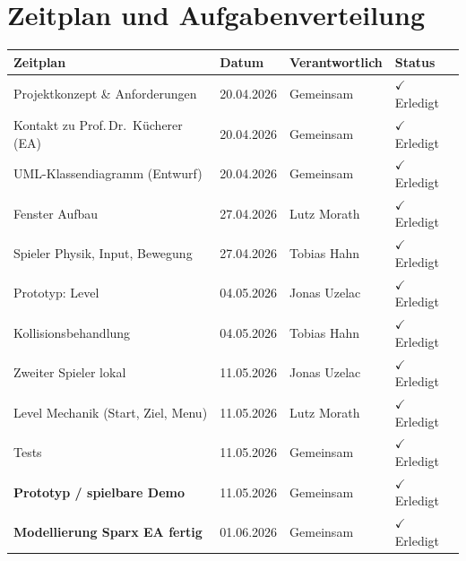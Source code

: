 \documentclass[12pt, a4paper, twoside]{article}
\begin{document}
\newpage
\section{Zeitplan und Aufgabenverteilung}

\begin{table}[H]
  \centering
  \begin{tabularx}{\textwidth}{X l l l}
    \toprule
    \rowcolor{primaryblue!20}
    \textbf{Zeitplan} & \textbf{Datum} & \textbf{Verantwortlich} & \textbf{Status} \\
    \midrule
    Projektkonzept \& Anforderungen       & 20.04.2026 & Gemeinsam & $\checkmark$ Erledigt \\
    Kontakt zu Prof.\,Dr.\ Kücherer (EA)  & 20.04.2026 & Gemeinsam & $\checkmark$ Erledigt \\
    UML-Klassendiagramm (Entwurf)         & 20.04.2026 & Gemeinsam & $\checkmark$ Erledigt \\

    Fenster Aufbau                        & 27.04.2026 & Lutz Morath & $\checkmark$ Erledigt \\

    Spieler Physik, Input, Bewegung       & 27.04.2026 & Tobias Hahn & $\checkmark$ Erledigt \\

    Prototyp: Level                       & 04.05.2026 & Jonas Uzelac & $\checkmark$ Erledigt \\

    Kollisionsbehandlung                 & 04.05.2026 & Tobias Hahn & $\checkmark$ Erledigt \\

    Zweiter Spieler lokal                 & 11.05.2026 & Jonas Uzelac & $\checkmark$ Erledigt \\

    Level Mechanik (Start, Ziel, Menu)    & 11.05.2026 & Lutz Morath & $\checkmark$ Erledigt \\

    Tests                                 & 11.05.2026 & Gemeinsam & $\checkmark$ Erledigt \\

    \textbf{Prototyp / spielbare Demo}    & 11.05.2026 & Gemeinsam & $\checkmark$ Erledigt \\

    \textbf{Modellierung Sparx EA fertig} & 01.06.2026 & Gemeinsam & $\checkmark$ Erledigt \\


\end{tabularx}
\end{table}
\end{document}
